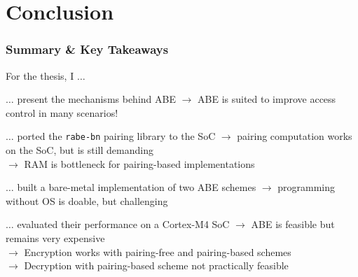 \section{Conclusion}
\begin{frame}[c]
    \frametitle{Summary \& Key Takeaways}
    
        For the thesis, I $\dots$

        \pause
        $\dots$ present the mechanisms behind ABE \textcolor{TUMGruen}{\checkmark} \pause \alert{$\rightarrow$ ABE is suited to improve access control in many scenarios!}

        \pause $\dots$ ported the \texttt{rabe-bn} pairing library to the SoC \textcolor{TUMGruen}{\checkmark} \pause \alert{$\rightarrow$ pairing computation works on the SoC, but is still demanding}\\
        \pause {} \alert{$\rightarrow$ RAM is bottleneck for pairing-based implementations}

        \pause $\dots$ built a bare-metal implementation of two ABE schemes \textcolor{TUMGruen}{\checkmark} \pause \alert{$\rightarrow$ programming without OS is doable, but challenging \smiley}

        \pause $\dots$ evaluated their performance on a Cortex-M4 SoC \textcolor{TUMGruen}{\checkmark} \pause \alert{$\rightarrow$ ABE is feasible but remains very expensive}\\        
        \pause {} \alert{$\rightarrow$ Encryption works with pairing-free and pairing-based schemes}\\
        \pause {} \alert{$\rightarrow$ Decryption with pairing-based scheme not practically feasible \frownie}


\end{frame}

